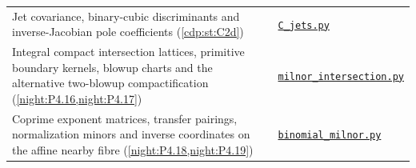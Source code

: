 \begin{longtable}{@{}>{\raggedright\arraybackslash}p{}>{\raggedright\arraybackslash}p{}@{}}
Jet covariance, binary-cubic discriminants and inverse-Jacobian pole coefficients (\cref{cdp:st:C2d}) & \href{https://raw.githubusercontent.com/KokunoYumeto/s6-complex-structure-workbench/\SsixRepositoryCommit/pro_returns/S6_03_CDP_checkpoint_13_20261116T0136Z/S6_03_CDP/code/C_jets.py}{\nolinkurl{C_jets.py}} \\[3pt]
Integral compact intersection lattices, primitive boundary kernels, blowup charts and the alternative two-blowup compactification (\cref{night:P4.16,night:P4.17}) & \href{https://raw.githubusercontent.com/KokunoYumeto/s6-complex-structure-workbench/\SsixRepositoryCommit/pro_returns/S6_06_BLIND_checkpoint_15_20261117T1457Z/S6_06_BLIND/code/part4/milnor_intersection.py}{\nolinkurl{milnor_intersection.py}} \\[3pt]
Coprime exponent matrices, transfer pairings, normalization minors and inverse coordinates on the affine nearby fibre (\cref{night:P4.18,night:P4.19}) & \href{https://raw.githubusercontent.com/KokunoYumeto/s6-complex-structure-workbench/\SsixRepositoryCommit/pro_returns/S6_06_BLIND_checkpoint_15_20261117T1457Z/S6_06_BLIND/code/part4/binomial_milnor.py}{\nolinkurl{binomial_milnor.py}} \\[3pt]
\end{longtable}